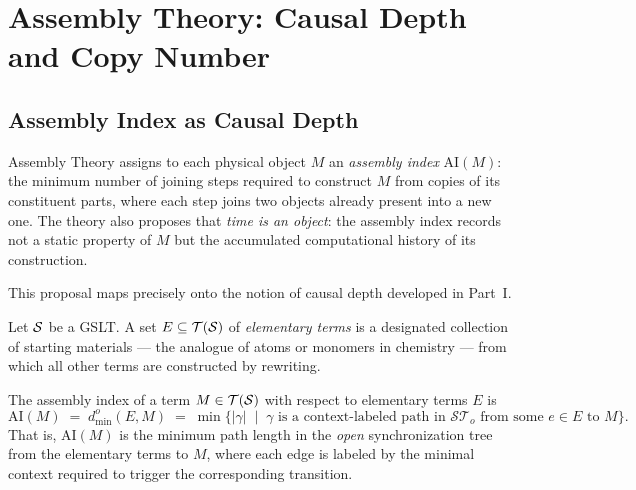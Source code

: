 \chapter{Assembly Theory: Causal Depth and Copy Number}
\label{sec:assembly}

\section{Assembly Index as Causal Depth}

Assembly Theory assigns to each physical object $M$ an
\emph{assembly index} $\mathrm{AI}(M)$: the minimum number of
joining steps required to construct $M$ from copies of its
constituent parts, where each step joins two objects already
present into a new one.
The theory also proposes that \emph{time is an object}: the
assembly index records not a static property of $M$ but the
accumulated computational history of its construction.

This proposal maps precisely onto the notion of causal depth
developed in Part~I.

\begin{definition}
Let $\mathcal{S}$ be a GSLT.
A set $E \subseteq \mathcal{T}(\mathcal{S})$ of \emph{elementary terms}
is a designated collection of starting materials --- the analogue
of atoms or monomers in chemistry --- from which all other terms
are constructed by rewriting.
\end{definition}

\begin{proposition}
\label{prop:assembly-index}
The assembly index of a term $M \in \mathcal{T}(\mathcal{S})$ with respect
to elementary terms $E$ is
\[
  \mathrm{AI}(M) \;=\; d^o_{\min}(E, M)
  \;=\; \min\bigl\{ |\gamma| \;\mid\;
    \gamma \text{ is a context-labeled path in } \mathcal{ST}_o
    \text{ from some } e \in E \text{ to } M
  \bigr\}.
\]
That is, $\mathrm{AI}(M)$ is the minimum path length in the
\emph{open} synchronization tree from the elementary terms to $M$,
where each edge is labeled by the minimal context required to
trigger the corresponding transition.
\end{proposition}

